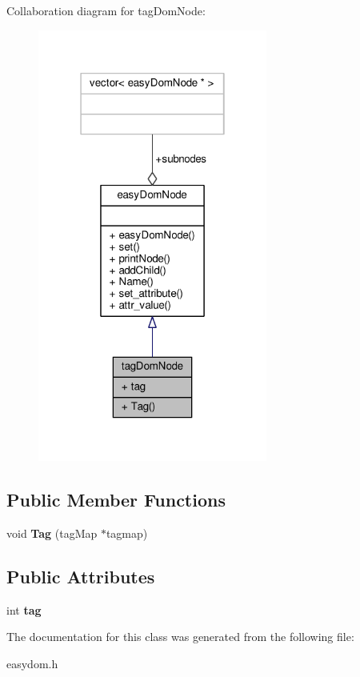 Collaboration diagram for tag\+Dom\+Node\+:
\nopagebreak
\begin{figure}[H]
\begin{center}
\leavevmode
\includegraphics[width=214pt]{dd/d96/classtagDomNode__coll__graph}
\end{center}
\end{figure}
\subsection*{Public Member Functions}
\begin{DoxyCompactItemize}
\item 
void {\bfseries Tag} (tag\+Map $\ast$tagmap)\hypertarget{classtagDomNode_abb8241f404b17d177c021c69f9a3eca2}{}\label{classtagDomNode_abb8241f404b17d177c021c69f9a3eca2}

\end{DoxyCompactItemize}
\subsection*{Public Attributes}
\begin{DoxyCompactItemize}
\item 
int {\bfseries tag}\hypertarget{classtagDomNode_afba3efc8810a3ed3d4e12096b9f01478}{}\label{classtagDomNode_afba3efc8810a3ed3d4e12096b9f01478}

\end{DoxyCompactItemize}


The documentation for this class was generated from the following file\+:\begin{DoxyCompactItemize}
\item 
easydom.\+h\end{DoxyCompactItemize}
